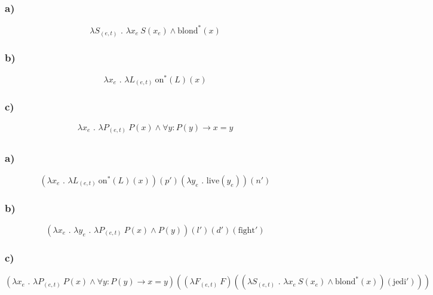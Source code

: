 \documentclass{article}
\renewcommand\t[1]{\text{#1}}
\renewcommand\d{\text{ . }}
\begin{document}

\section{}

\subsection{}

\subsubsection*{a)}

$$
\lambda S_{(e,t)} \d \lambda x_e \ S(x_e) \wedge \t{blond}^*(x) 
$$

\subsubsection*{b)}

$$
\lambda x_e \d \lambda L_{(e,t)} \ \t{on}^*(L)(x)
$$

\subsubsection*{c)}

$$
\lambda x_e \d \lambda P_{(e,t)} \ P(x) \wedge \forall y: P(y) \rightarrow x = y
$$

\subsection{}

\subsubsection*{a)}

$$
(\lambda x_e \d \lambda L_{(e,t)} \ \t{on}^*(L)(x))(p')(\lambda y_e \d \t{live}(y_e))(n')
$$

\subsubsection*{b)}

$$
(\lambda x_e \d \lambda y_e \d \lambda P_{(e,t)} \ P(x) \wedge P(y))(l')(d')(\t{fight}')
$$

\subsubsection*{c)}

$$
(\lambda x_e \d \lambda P_{(e,t)} \ P(x) \wedge \forall y: P(y) \rightarrow x = y)
(
(\lambda F_{(e,t)} \ F)
(
(\lambda S_{(e,t)} \d \lambda x_e \ S(x_e) \wedge \t{blond}^*(x))
(\t{jedi}')
)
)
$$
\end{document}
